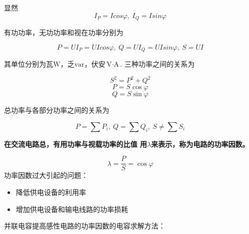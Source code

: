 显然
\[
    I_P=Icos\varphi,~ I_Q=Isin\varphi
\]

有功功率，无功功率和视在功率分别为

\[
    P=UI_P=UIcos\varphi,~ Q=UI_Q=UIsin\varphi,~ S=UI
\]

其单位分别为瓦$\text{W}$，乏$\text{var}$，伏安$\text{V}\cdot \text{A}$.
三种功率之间的关系为

\[
    S^2=P^2+Q^2
\]
\[
    P=S\cos\varphi 
\]
\[
    Q=S\sin\varphi 
\]

总功率与各部分功率之间的关系为

\[
    P=\sum P_i,~ Q=\sum Q_i,~ S \ne \sum S_i
\]

\textbf{在交流电路总，有用功率与视载功率的比值
用$\lambda$来表示，称为电路的功率因数。}

\[
    \lambda = \frac{P}{S} = \cos \varphi
\]
功率因数过大引起的问题：
\begin{itemize}
    \item 降低供电设备的利用率
    \item 增加供电设备和输电线路的功率损耗
\end{itemize}
并联电容提高感性电路的功率因数的电容求解方法：

